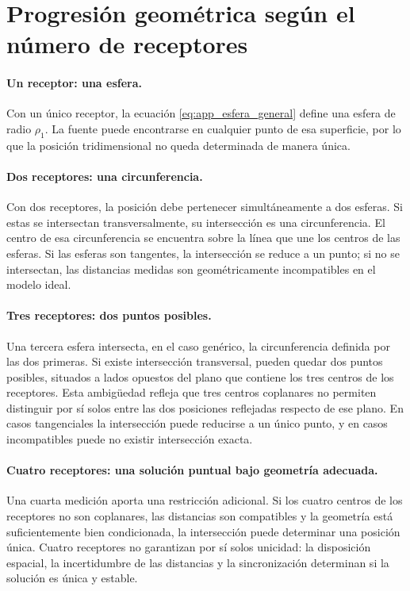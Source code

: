 \section{Progresión geométrica según el número de receptores}

\paragraph{Un receptor: una esfera.}
Con un único receptor, la ecuación
\eqref{eq:app_esfera_general} define una esfera de radio $\rho_1$.
La fuente puede encontrarse en cualquier punto de esa superficie, por
lo que la posición tridimensional no queda determinada de manera única.

\paragraph{Dos receptores: una circunferencia.}
Con dos receptores, la posición debe pertenecer simultáneamente a dos
esferas. Si estas se intersectan transversalmente, su intersección es
una circunferencia. El centro de esa circunferencia se encuentra sobre
la línea que une los centros de las esferas. Si las esferas son
tangentes, la intersección se reduce a un punto; si no se intersectan,
las distancias medidas son geométricamente incompatibles en el modelo
ideal.

\paragraph{Tres receptores: dos puntos posibles.}
Una tercera esfera intersecta, en el caso genérico, la circunferencia
definida por las dos primeras. Si existe intersección transversal,
pueden quedar dos puntos posibles, situados a lados opuestos del plano
que contiene los tres centros de los receptores. Esta ambigüedad
refleja que tres centros coplanares no permiten distinguir por sí solos
entre las dos posiciones reflejadas respecto de ese plano. En casos
tangenciales la intersección puede reducirse a un único punto, y en
casos incompatibles puede no existir intersección exacta.

\paragraph{Cuatro receptores: una solución puntual bajo geometría adecuada.}
Una cuarta medición aporta una restricción adicional. Si los cuatro
centros de los receptores no son coplanares, las distancias son
compatibles y la geometría está suficientemente bien condicionada,
la intersección puede determinar una posición única. Cuatro
receptores no garantizan por sí solos unicidad: la disposición
espacial, la incertidumbre de las distancias y la sincronización
determinan si la solución es única y estable.

